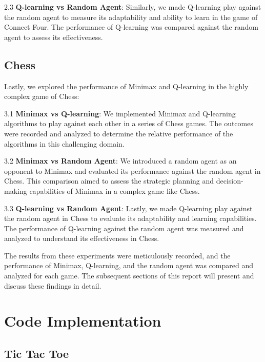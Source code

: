 \documentclass{article}
\begin{document}
2.3 \textbf{Q-learning vs Random Agent}: Similarly, we made Q-learning play against the random agent to measure its adaptability and ability to learn in the game of Connect Four. The performance of Q-learning was compared against the random agent to assess its effectiveness.

\pagebreak
\subsection{Chess}
Lastly, we explored the performance of Minimax and Q-learning in the highly complex game of Chess:

3.1 \textbf{Minimax vs Q-learning}: We implemented Minimax and Q-learning algorithms to play against each other in a series of Chess games. The outcomes were recorded and analyzed to determine the relative performance of the algorithms in this challenging domain.

3.2 \textbf{Minimax vs Random Agent}: We introduced a random agent as an opponent to Minimax and evaluated its performance against the random agent in Chess. This comparison aimed to assess the strategic planning and decision-making capabilities of Minimax in a complex game like Chess.

3.3 \textbf{Q-learning vs Random Agent}: Lastly, we made Q-learning play against the random agent in Chess to evaluate its adaptability and learning capabilities. The performance of Q-learning against the random agent was measured and analyzed to understand its effectiveness in Chess.

The results from these experiments were meticulously recorded, and the performance of Minimax, Q-learning, and the random agent was compared and analyzed for each game. The subsequent sections of this report will present and discuss these findings in detail.

\pagebreak
\section{Code Implementation}

\subsection{Tic Tac Toe}
\end{document}
